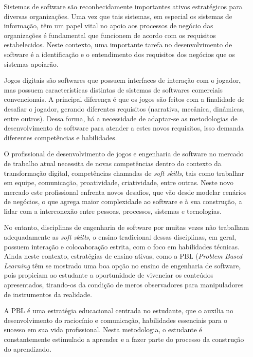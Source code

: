 \documentclass[12pt, onecolumn]{IEEEtran}
\begin{document}
Sistemas de software são reconhecidamente importantes ativos estratégicos para diversas organizações. Uma vez que tais sistemas, em especial os sistemas de informação, têm um papel vital no apoio aos processos de negócio das organizações é fundamental que funcionem de acordo com os requisitos estabelecidos. Neste contexto, uma importante tarefa no desenvolvimento de software é a identificação e o entendimento dos requisitos dos negócios que os sistemas apoiarão\cite{b1}.

Jogos digitais são softwares que possuem interfaces de interação com o jogador, mas possuem características distintas de sistemas de softwares comerciais convencionais. A principal diferença é que os jogos são feitos com a finalidade de desafiar o jogador\cite{b2}, gerando diferentes requisitos (narrativa, mecânica, dinâmicas, entre outros). Dessa forma, há a necessidade de adaptar-se as metodologias de desenvolvimento de software para atender a estes novos requisitos, isso demanda diferentes competências e habilidades.

O profissional de desenvolvimento de jogos e engenharia de software no mercado de trabalho atual necessita de novas competências dentro do contexto da transformação digital\cite{b3}, competências chamadas de \textit{soft skills}, tais como trabalhar em equipe, comunicação, proatividade, criatividade, entre outras\cite{b4}. Neste novo mercado este profissional enfrenta novos desafios, que vão desde modelar cenários de negócios, o que agrega maior complexidade ao software e à sua construção, a lidar com a interconexão entre pessoas, processos, sistemas e tecnologias\cite{b5}.

No entanto, disciplinas de engenharia de software por muitas vezes não trabalham adequadamente as \textit{soft skills}, o ensino tradicional dessas disciplinas, em geral, possuem interação e colocaboração estrita, com o foco em habilidades técnicas. Ainda neste contexto, estratégias de ensino ativas, como a PBL (\textit{Problem Based Learning} têm se mostrado uma boa opção no ensino de engenharia de software, pois propiciam ao estudante a oportunidade de vivenciar os conteúdos apresentados, tirando-os  da  condição  de  meros  observadores para manipuladores de instrumentos da realidade\cite{b7}.

A PBL é uma estratégia educacional centrada no estudante, que o auxilia no desenvolvimento do raciocínio e comunicação, habilidades essenciais para o sucesso em sua vida profissional. Nesta metodologia, o estudante é constantemente estimulado a aprender e a fazer parte do processo da construção do aprendizado.\cite{b8}\cite{b9}\cite{b10}
\end{document}
